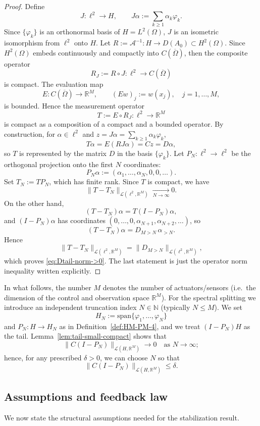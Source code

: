 \documentclass[11pt,a4paper]{article}
\numberwithin{equation}{section}
\theoremstyle{definition}
\newcommand{\1}{\mathbbm{1}}
\begin{document}
\begin{proof}
Define
\[
J:\ell^2 \to H,\qquad J\alpha := \sum_{k\ge1}\alpha_k\varphi_k.
\]
Since $\{\varphi_k\}$ is an orthonormal basis of $H=L^2(\Omega)$, $J$ is an
isometric isomorphism from $\ell^2$ onto $H$.
\noindent
Let $R:=\mathcal A^{-1}:H\to D(A_0)\subset H^2(\Omega)$. Since
$H^2(\Omega)$ embeds continuously and compactly into $C(\overline\Omega)$,
then the composite operator
\[
R_J := R\circ J:\ell^2\to C(\overline\Omega)
\]
is compact. The evaluation map
\[
E: C(\overline\Omega)\to\mathbb{R}^M,\qquad
(Ew)_j := w(x_j),\quad j=1,\dots,M,
\]
is bounded. Hence the measurement operator
\[
T := E\circ R_J:\ell^2\to\mathbb{R}^M
\]
is compact as a composition of a compact and a bounded operator.
\newline
By construction, for $\alpha\in\ell^2$ and
$z=J\alpha=\sum_{k\ge1}\alpha_k\varphi_k$,
\[
T\alpha = E(RJ\alpha) = C z = D\alpha,
\]
so $T$ is represented by the matrix $D$ in the basis $\{\varphi_k\}$.
\newline
Let $P_N:\ell^2\to\ell^2$ be the orthogonal projection onto the first $N$
coordinates:
\[
P_N\alpha := (\alpha_1,\dots,\alpha_N,0,0,\dots).
\]
Set $T_N := T P_N$, which has finite rank. Since $T$ is compact, we have
\[
\|T - T_N\|_{\mathcal{L}(\ell^2,\mathbb{R}^M)}
\xrightarrow[N\to\infty]{} 0.
\]
On the other hand,
\[
(T-T_N)\alpha = T(I-P_N)\alpha,
\]
and $(I-P_N)\alpha$ has coordinates
$(0,\dots,0,\alpha_{N+1},\alpha_{N+2},\dots)$, so
\[
(T-T_N)\alpha = D_{M> N}\,\alpha_{>N}.
\]
Hence
\[
\|T-T_N\|_{\mathcal{L}(\ell^2,\mathbb{R}^M)}
= \|D_{M> N}\|_{\mathcal{L}(\ell^2,\mathbb{R}^M)},
\]
which proves \eqref{eq:Dtail-norm->0}. The last statement is just the
operator norm inequality written explicitly.
\end{proof}
\noindent
In what follows, the number $M$ denotes the number of actuators/sensors (i.e.\ the dimension
of the control and observation space $\mathbb{R}^M$). For the spectral splitting we introduce
an independent truncation index $N\in\mathbb{N}$ (typically $N\le M$). We set
\[
H_N := \mathrm{span}\{\varphi_1,\dots,\varphi_N\}
\]
and $P_N:H\to H_N$ as in Definition~\ref{def:HM-PM-4}, and we treat $(I-P_N)H$ as the tail.
Lemma~\ref{lem:tail-small-compact} shows that
\[
\|C(I-P_N)\|_{\mathcal{L}(H,\mathbb{R}^M)} \longrightarrow 0
\quad\text{as } N\to\infty;
\]
hence, for any prescribed $\delta>0$, we can choose $N$ so that
\[
\|C(I-P_N)\|_{\mathcal{L}(H,\mathbb{R}^M)} \le \delta.
\]

\subsection{Assumptions and feedback law}
\label{subsec:assumptions-4}
\noindent
We now state the structural assumptions needed for the stabilization result.
\end{document}
